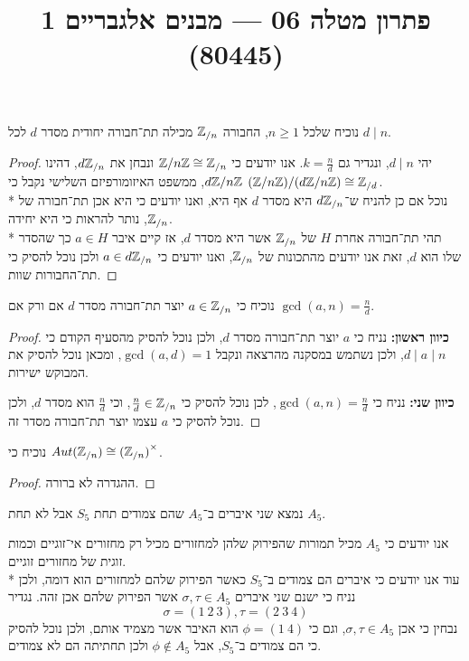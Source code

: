 
\title{פתרון מטלה 06 --- מבנים אלגבריים 1 (80445)}


\maketitle
\maketitleprint{}

\Question{}
\Subquestion{}
נוכיח שלכל $n \ge 1$, החבורה $\mathbb{Z}_{/n}$ מכילה תת־חבורה יחודית מסדר $d$ לכל $d \mid n$.
\begin{proof}
	יהי $d \mid n$, ונגדיר גם $k = \frac{n}{d}$.
	אנו יודעים כי $\mathbb{Z} / n\mathbb{Z} \cong \mathbb{Z}_{/n}$ ונבחן את $d\mathbb{Z}_{/n}$, דהינו $d\mathbb{Z}/n\mathbb{Z}$, 
	ממשפט האיזומורפיזם השלישי נקבל כי $(\mathbb{Z} / n\mathbb{Z}) / (d\mathbb{Z} / n\mathbb{Z}) \cong \mathbb{Z}_{/d}$. \\*
	נוכל אם כן להניח ש־$d\mathbb{Z}_{/n}$ היא מסדר $d$ אף היא, ואנו יודעים כי היא אכן תת־חבורה של $\mathbb{Z}_{/n}$, נותר להראות כי היא יחידה. \\*
	תהי תת־חבורה אחרת $H$ של $\mathbb{Z}_{/n}$ אשר היא מסדר $d$, אז קיים איבר $a \in H$ כך שהסדר שלו הוא $d$, זאת אנו יודעים מהתכונות של $\mathbb{Z}_{/n}$, ואנו יודעים כי $a \in d\mathbb{Z}_{/n}$ ולכן נוכל להסיק כי תת־החבורות שוות.
\end{proof}

\Subquestion{}
נוכיח כי $a \in \mathbb{Z}_{/n}$ יוצר תת־חבורה מסדר $d$ אם ורק אם $\gcd(a, n) = \frac{n}{d}$.
\begin{proof}
	\textbf{כיוון ראשון:}
	נניח כי $a$ יוצר תת־חבורה מסדר $d$, ולכן נוכל להסיק מהסעיף הקודם כי $d \mid a \mid n$, ולכן נשתמש במסקנה מהרצאה ונקבל $\gcd(a, d) = 1$, ומכאן נוכל להסיק את המבוקש ישירות.

	\textbf{כיוון שני:}
	נניח כי $\gcd(a, n) = \frac{n}{d}$, לכן נוכל להסיק כי $\frac{n}{d} \in \mathbb{Z}_{/n}$, וכי $\frac{n}{d}$ הוא מסדר $d$, ולכן נוכל להסיק כי $a$ עצמו יוצר תת־חבורה מסדר זה.
\end{proof}

\Subquestion{}
נוכיח כי $Aut(\mathbb{Z}_{/n}) \cong {(\mathbb{Z}_{/n})}^\times$.
\begin{proof}
	ההגדרה לא ברורה.
\end{proof}

\Question{}
נמצא שני איברים ב־$A_5$ שהם צמודים תחת $S_5$ אבל לא תחת $A_5$.

אנו יודעים כי $A_5$ מכיל תמורות שהפירוק שלהן למחזורים מכיל רק מחזורים אי־זוגיים וכמות זוגית של מחזורים זוגיים. \\*
עוד אנו יודעים כי איברים הם צמודים ב־$S_5$ כאשר הפירוק שלהם למחזורים הוא דומה, ולכן נניח כי ישנם שני איברים $\sigma, \tau \in A_5$ אשר הפירוק שלהם אכן זהה.
נגדיר
\[
	\sigma = (1\ 2\ 3), \tau = (2\ 3\ 4)
\]
נבחין כי אכן $\sigma, \tau \in A_5$, וגם כי $\phi = (1\ 4)$ הוא האיבר אשר מצמיד אותם, ולכן נוכל להסיק כי הם צמודים ב־$S_5$, אבל $\phi \notin A_5$ ולכן תחתיתה הם לא צמודים.

